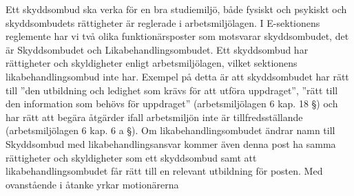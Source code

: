 \documentclass[../_main/handlingar.tex]{subfiles}
\begin{document}
Ett skyddsombud ska verka för en bra studiemiljö, både fysiskt och psykiskt och
skyddsombudets rättigheter är reglerade i arbetsmiljölagen. I E-sektionens reglemente har vi två olika funktionärsposter som motsvarar skyddsombudet, det är Skyddsombudet och Likabehandlingsombudet. Ett skyddsombud har rättigheter och skyldigheter enligt arbetsmiljölagen, vilket sektionens likabehandlingsombud inte har. Exempel på detta är att skyddsombudet har rätt till ”den utbildning och ledighet som krävs för att utföra uppdraget”,
”rätt till den information som behövs för uppdraget” (arbetsmiljölagen 6 kap. 18 §) och har rätt att begära åtgärder ifall arbetsmiljön inte är tillfredsställande (arbetsmiljölagen 6 kap. 6 a §).
Om likabehandlingsombudet ändrar namn till Skyddsombud med likabehandlingsansvar
kommer även denna post ha samma rättigheter och skyldigheter som ett skyddsombud samt att likabehandlingsombudet får rätt till en relevant utbildning för posten. Med ovanstående i åtanke yrkar motionärerna
\end{document}
